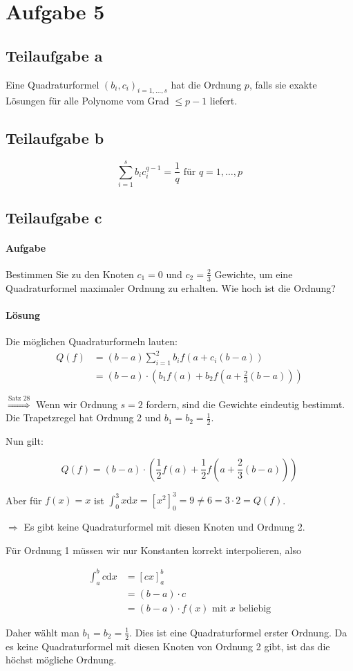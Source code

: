 \section*{Aufgabe 5}
\subsection*{Teilaufgabe a}
Eine Quadraturformel $(b_i, c_i)_{i=1, \dots, s}$ hat die Ordnung
$p$, falls sie exakte Lösungen für alle Polynome vom Grad $\leq p -1$
liefert.

\subsection*{Teilaufgabe b}
\[\sum_{i=1}^s b_i c_i^{q-1} = \frac{1}{q} \text{ für } q = 1, \dots, p\]

\subsection*{Teilaufgabe c}
\paragraph{Aufgabe} Bestimmen Sie zu den Knoten $c_1 = 0$ und $c_2 = \frac{2}{3}$ Gewichte, um eine Quadraturformel
maximaler Ordnung zu erhalten. Wie hoch ist die Ordnung?

\paragraph{Lösung}
Die möglichen Quadraturformeln lauten:
\begin{align}
	Q(f) &= (b-a)\sum_{i=1}^2 b_i f (a+ c_i (b-a))\\
		 &= (b-a) \cdot \left ( b_1 f(a) + b_2 f \left (a + \frac{2}{3}(b-a) \right ) \right )
\end{align}

$\stackrel{\text{Satz 28}}{\Rightarrow}$ Wenn wir Ordnung $s = 2$ fordern, sind die Gewichte eindeutig bestimmt.
Die Trapetzregel hat Ordnung 2 und $b_1 = b_2 = \frac{1}{2}$.

Nun gilt:

\[Q(f) = (b-a) \cdot \left (\frac{1}{2} f(a) + \frac{1}{2} f (a + \frac{2}{3} (b-a)) \right ) \]

Aber für $f(x) = x$ ist $\int_0^3 x \mathrm d x = \left [x^2 \right ]_0^3 = 9 \neq 6 = 3 \cdot 2 = Q(f)$.

$\Rightarrow$ Es gibt keine Quadraturformel mit diesen Knoten und Ordnung 2.

Für Ordnung 1 müssen wir nur Konstanten korrekt interpolieren, also

\begin{align}
	\int_a^b c \mathrm d x &= \left [ cx \right ]_a^b\\
	&= (b-a) \cdot c\\
	&= (b-a) \cdot f(x) \text{ mit } x \text{ beliebig}
\end{align}

Daher wählt man $b_1 = b_2 = \frac{1}{2}$. Dies ist eine Quadraturformel erster Ordnung.
Da es keine Quadraturformel mit diesen Knoten von Ordnung 2 gibt, ist das die höchst mögliche Ordnung.
